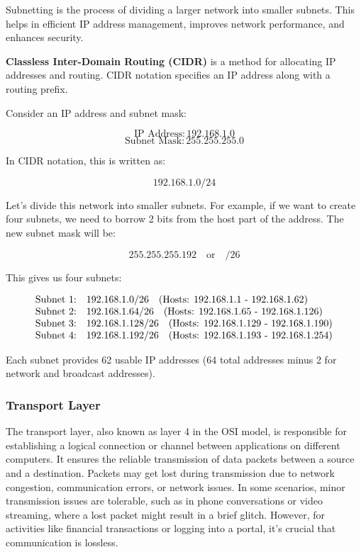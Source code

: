 Subnetting is the process of dividing a larger network into smaller subnets. This helps in efficient IP address management, improves network performance, and enhances security.

\textbf{Classless Inter-Domain Routing (CIDR)} is a method for allocating IP addresses and routing. CIDR notation specifies an IP address along with a routing prefix.

Consider an IP address and subnet mask:

\[
\text{IP Address}: 192.168.1.0
\]
\[
\text{Subnet Mask}: 255.255.255.0
\]

In CIDR notation, this is written as:

\[
192.168.1.0/24
\]


Let's divide this network into smaller subnets. For example, if we want to create four subnets, we need to borrow 2 bits from the host part of the address. The new subnet mask will be:

\[
255.255.255.192 \quad \text{or} \quad /26
\]

This gives us four subnets:

\[
\begin{array}{l l}
\text{Subnet 1:} & 192.168.1.0/26 \quad \text{(Hosts: 192.168.1.1 - 192.168.1.62)} \\
\text{Subnet 2:} & 192.168.1.64/26 \quad \text{(Hosts: 192.168.1.65 - 192.168.1.126)} \\
\text{Subnet 3:} & 192.168.1.128/26 \quad \text{(Hosts: 192.168.1.129 - 192.168.1.190)} \\
\text{Subnet 4:} & 192.168.1.192/26 \quad \text{(Hosts: 192.168.1.193 - 192.168.1.254)} \\
\end{array}
\]

Each subnet provides 62 usable IP addresses (64 total addresses minus 2 for network and broadcast addresses).


\subsubsection{\textbf{Transport Layer}}
The transport layer, also known as layer 4 in the OSI model, is responsible for establishing a logical connection or channel between applications on different computers. It ensures the reliable transmission of data packets between a source and a destination. Packets may get lost during transmission due to network congestion, communication errors, or network issues. In some scenarios, minor transmission issues are tolerable, such as in phone conversations or video streaming, where a lost packet might result in a brief glitch. However, for activities like financial transactions or logging into a portal, it's crucial that communication is lossless.

